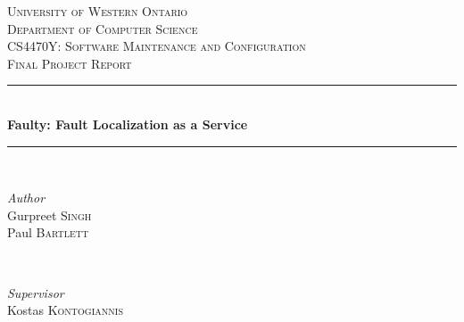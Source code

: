 \documentclass[12pt]{article}
\begin{document}

\begin{titlepage} %
	\newcommand{\HRule}{\rule{\linewidth}{0.5mm}} %
	
	\center %
	
	
	\textsc{\LARGE University of Western Ontario}\\[0.8cm] %

	\textsc{\Large Department of Computer Science}\\[1.5cm] %
	
	\textsc{\large CS4470Y: Software Maintenance and Configuration}\\[0.8cm] %
	
	\textsc{\large Final Project Report}\\[0.8cm] %
	
	
	\HRule\\[0.4cm]
	
	{\huge\bfseries Faulty: Fault Localization as a Service}\\[0.4cm] %
	
	\HRule\\[1.5cm]
	
	
	\begin{minipage}{0.4\textwidth}
		\begin{flushleft}
			\large
			\textit{Author}\\
            			Gurpreet \textsc{Singh} \\             			Paul \textsc{Bartlett} \\ 		\end{flushleft}
	\end{minipage}
	~
	\begin{minipage}{0.4\textwidth}
		\begin{flushright}
            			    \large
			    \textit{Supervisor}\\
                                    Kostas \textsc{Kontogiannis}\\[0.5cm]
                            

\end{flushright}
\end{minipage}
\end{titlepage}
\end{document}

